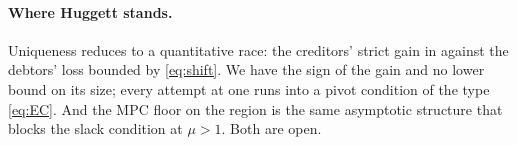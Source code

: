 \paragraph{Where Huggett stands.}
Uniqueness reduces to a quantitative race: the creditors' strict gain in 
against the debtors' loss bounded by \eqref{eq:shift}. We have the sign of the gain and no lower
bound on its size; every attempt at one runs into a pivot condition of the type \eqref{eq:EC}. And
the MPC floor on the region is the same asymptotic structure that blocks the slack condition at
$\mu>1$. Both are open.
